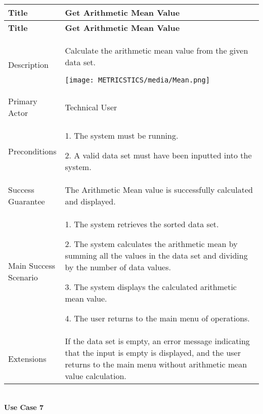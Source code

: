     \begin{longtable}{|p{0.227\linewidth}|p{0.773\linewidth}|}
    \hline
    \textbf{Title} & \textbf{Get Arithmetic Mean Value} \\
    \hline
    \endfirsthead
    \hline
    \textbf{Title} & \textbf{Get Arithmetic Mean Value} \\
    \hline
    \endhead
    \hline
    \endfoot
    \hline
    \endlastfoot
    Description & Calculate the arithmetic mean value from the given data
    set.
    
    \texttt{[image: METRICSTICS/media/Mean.png]} \\ \hline
    Primary Actor & Technical User \\ \hline
    Preconditions & 1. The system must be running.
    
    2. A valid data set must have been inputted into the system. \\ \hline
    Success Guarantee & The Arithmetic Mean value is successfully calculated
    and displayed. \\ \hline
    Main Success Scenario & 1. The system retrieves the sorted data set.
    
    2. The system calculates the arithmetic mean by summing all the values
    in the data set and dividing by the number of data values.
    
    3. The system displays the calculated arithmetic mean value.
    
    4. The user returns to the main menu of operations. \\ \hline
    Extensions & If the data set is empty, an error message indicating that
    the input is empty is displayed, and the user returns to the main menu
    without arithmetic mean value calculation.
    \end{longtable}

    \strut \\
    \textbf{\large Use Case 7}
    
